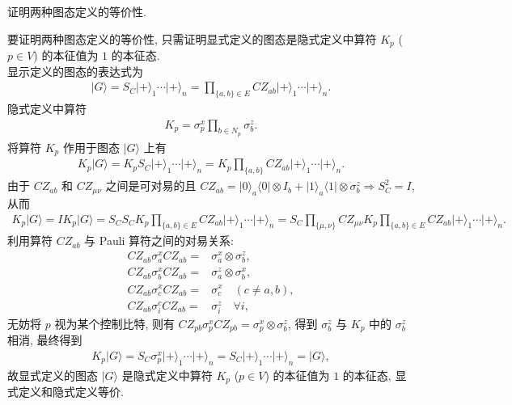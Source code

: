 \documentclass{assignment}
\begin{document}
\begin{prob}
    证明两种图态定义的等价性.
\end{prob}
\begin{sol}
    要证明两种图态定义的等价性, 只需证明显式定义的图态是隐式定义中算符 $K_p$ ($p\in V$) 的本征值为 $1$ 的本征态.\\
    显示定义的图态的表达式为
    \begin{align}
        \lvert G\rangle=S_C\lvert+\rangle_1\cdots\lvert+\rangle_n=\prod_{\{a,b\}\in E}CZ_{ab}\lvert+\rangle_1\cdots\lvert+\rangle_n.
    \end{align}
    隐式定义中算符
    \begin{align}
        K_p=\sigma_p^x\prod_{b\in N_p}\sigma_b^z.
    \end{align}
    将算符 $K_p$ 作用于图态 $\lvert G\rangle$ 上有
    \begin{align}
        K_p\lvert G\rangle=K_pS_C\lvert+\rangle_1\cdots\lvert+\rangle_n=K_p\prod_{\{a,b\}}CZ_{ab}\lvert+\rangle_1\cdots\lvert+\rangle_n.
    \end{align}
    由于 $CZ_{ab}$ 和 $CZ_{\mu\nu}$ 之间是可对易的且 $CZ_{ab}=\lvert 0\rangle_a\langle 0\rvert\otimes I_b+\lvert 1\rangle_a\langle 1\rvert\otimes\sigma_b^z\Longrightarrow S_C^2=I$, 从而
    \begin{align}
        K_p\lvert G\rangle=IK_p\lvert G\rangle=S_CS_CK_p\prod_{\{a,b\}\in E}CZ_{ab}\lvert+\rangle_1\cdots\lvert+\rangle_n=S_C\prod_{\{\mu,\nu\}}CZ_{\mu\nu}K_p\prod_{\{a,b\}\in E}CZ_{ab}\lvert+\rangle_1\cdots\lvert+\rangle_n.
    \end{align}
    利用算符 $CZ_{ab}$ 与 Pauli 算符之间的对易关系:
    \begin{align}
        CZ_{ab}\sigma_a^xCZ_{ab}=&\sigma_a^x\otimes\sigma_b^z,\\
        CZ_{ab}\sigma_b^xCZ_{ab}=&\sigma_a^z\otimes\sigma_b^x,\\
        CZ_{ab}\sigma_c^xCZ_{ab}=&\sigma_c^x\quad(c\neq a,b),\\
        CZ_{ab}\sigma_i^cCZ_{ab}=&\sigma_i^z\quad\forall i,
    \end{align}
    无妨将 $p$ 视为某个控制比特, 则有 $CZ_{pb}\sigma_p^xCZ_{pb}=\sigma_p^x\otimes\sigma_b^z$, 得到 $\sigma_b^z$ 与 $K_p$ 中的 $\sigma_b^z$ 相消, 最终得到
    \begin{align}
        K_p\lvert G\rangle=S_C\sigma_p^x\lvert+\rangle_1\cdots\lvert+\rangle_n=S_C\lvert+\rangle_1\cdots\lvert+\rangle_n=\lvert G\rangle,
    \end{align}
    故显式定义的图态 $\lvert G\rangle$ 是隐式定义中算符 $K_p$ ($p\in V$) 的本征值为 $1$ 的本征态, 显式定义和隐式定义等价.
\end{sol}
\end{document}
